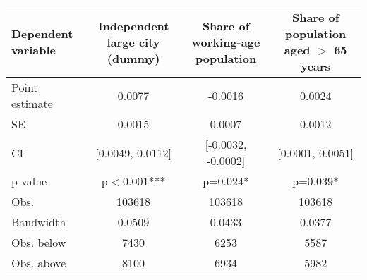 \begin{tabular}{lccc}
  \toprule
 \midrule
Dependent variable & Independent large city (dummy) & Share of working-age population & Share of population aged $>$ 65 years \\ 
  \midrule
Point estimate &   0.0077 &  -0.0016 &   0.0024 \\ 
  SE &  0.0015 &  0.0007 &  0.0012 \\ 
  CI & [0.0049, 0.0112] & [-0.0032, -0.0002] & [0.0001, 0.0051] \\ 
  p value & p$<$0.001*** & p=0.024* & p=0.039* \\ 
   \midrule
Obs. & 103618 & 103618 & 103618 \\ 
  Bandwidth & 0.0509 & 0.0433 & 0.0377 \\ 
  Obs. below &  7430 &  6253 &  5587 \\ 
  Obs. above &  8100 &  6934 &  5982 \\ 
   \midrule
 \bottomrule
\end{tabular}
